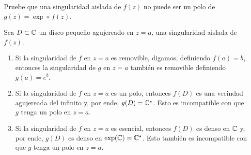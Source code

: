 \begin{exercise}
Pruebe que una singularidad aislada de $f(z)$ no puede ser un polo de $g(z) = \exp \circ \, f(z)$.
\end{exercise}

\begin{solution}
Sea $D \subset \mathbb C$ un disco pequeño agujereado en $z = a$, una singularidad aislada de $f(z)$.

\begin{enumerate}[label=(\alph*)]
    \item Si la singularidad de $f$ en $z = a$ es removible, digamos, definiendo $f(a) = b$, entonces la singularidad de $g$ en $z = a$ también es removible definiendo $g(a) = e^b$.
    
    \item Si la singularidad de $f$ en $z = a$ es un polo, entonces $f(D)$ es una vecindad agujereada del infinito y, por ende, $g(D) = \mathbb C^\star$. Esto es incompatible con que $g$ tenga un polo en $z = a$.
    
    \item Si la singularidad de $f$ en $z = a$ es esencial, entonces $f(D)$ es denso en $\mathbb C$ y, por ende, $g(D)$ es denso en $\exp(\mathbb C) = \mathbb C^\star$. Esto también es incompatible con que $g$ tenga un polo en $z = a$.
\end{enumerate}
\end{solution}
